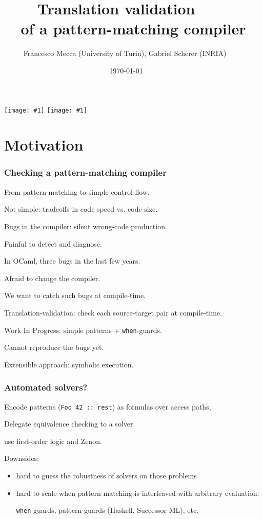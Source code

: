 \documentclass[dvipsnames,aspectratio=169]{beamer}
\title{Translation validation $\qquad$ \\ of a pattern-matching compiler $\qquad$}
\subtitle{}
\author{Francesco Mecca (University of Turin), Gabriel Scherer (INRIA) $\qquad$}
\date{\today$\qquad$}
\begin{document}

\newcommand{\showface}[1]{\texttt{[image: \#1]}}
\begin{frame}
  \titlepage

\begin{center}
  \showface{pictures/Francesco_Mecca.jpg}
  \showface{pictures/Gabriel_Scherer.jpg}
  $\qquad$
\end{center}
\end{frame}

\section{Motivation}

\begin{frame}
  \frametitle{Checking a pattern-matching compiler}

  From pattern-matching to simple control-flow.

  Not simple: tradeoffs in code speed vs. code size.

  \vfill

  Bugs in the compiler: silent wrong-code production.

  Painful to detect and diagnose.

  \vfill

  In OCaml, three bugs in the last few years.

  Afraid to change the compiler.

  \vfill

  We want to catch such bugs at compile-time.

  Translation-validation: check each source-target pair at compile-time.

  \vfill

  \alert{Work In Progress}: simple patterns + \texttt{when}-guards.

  Cannot reproduce the bugs yet.

  Extensible approach: symbolic execution.
\end{frame}

\begin{frame}
  \frametitle{Automated solvers?}

  Encode patterns (\lstinline{Foo 42 :: rest})
  as formulas over access paths,

  Delegate equivalence checking to a solver.

  \vfill

  \citet*{tom} use first-order logic and Zenon.

  \vfill

  Downsides:
  \begin{itemize}
  \item hard to guess the robustness of solvers on those problems
  \item hard to scale when pattern-matching is interleaved with arbitrary evaluation:

    \texttt{when} guards, pattern guards (Haskell, Successor ML), etc.
  \end{itemize}

  \vfill\vfill

  
\end{frame}
\end{document}

